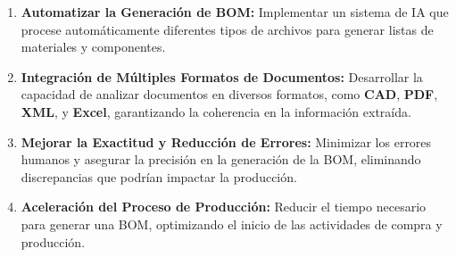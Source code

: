 \documentclass[
  10pt,
  letterpaper,
]{book}
\providecommand{\tightlist}{%
  \setlength{\itemsep}{0pt}\setlength{\parskip}{0pt}}\usepackage{longtable,booktabs,array}
\begin{document}
\begin{enumerate}
\def\labelenumi{\arabic{enumi}.}
\tightlist
\item
  \textbf{Automatizar la Generación de BOM:} Implementar un sistema de
  IA que procese automáticamente diferentes tipos de archivos para
  generar listas de materiales y componentes.
\item
  \textbf{Integración de Múltiples Formatos de Documentos:} Desarrollar
  la capacidad de analizar documentos en diversos formatos, como
  \textbf{CAD}, \textbf{PDF}, \textbf{XML}, y \textbf{Excel},
  garantizando la coherencia en la información extraída.
\item
  \textbf{Mejorar la Exactitud y Reducción de Errores:} Minimizar los
  errores humanos y asegurar la precisión en la generación de la BOM,
  eliminando discrepancias que podrían impactar la producción.
\item
  \textbf{Aceleración del Proceso de Producción:} Reducir el tiempo
  necesario para generar una BOM, optimizando el inicio de las
  actividades de compra y producción.
\end{enumerate}
\end{document}
